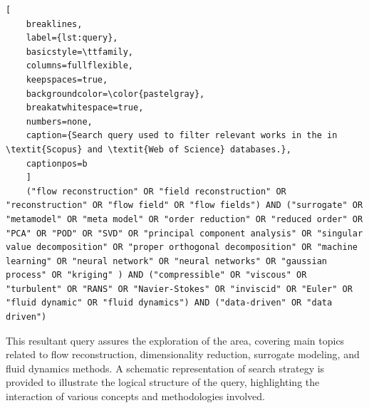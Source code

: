 \begin{lstlisting}[
    breaklines, 
    label={lst:query},
    basicstyle=\ttfamily, 
    columns=fullflexible, 
    keepspaces=true,
    backgroundcolor=\color{pastelgray}, 
    breakatwhitespace=true, 
    numbers=none,
    caption={Search query used to filter relevant works in the in \textit{Scopus} and \textit{Web of Science} databases.},
    captionpos=b
    ]
    ("flow reconstruction" OR "field reconstruction" OR "reconstruction" OR "flow field" OR "flow fields") AND ("surrogate" OR "metamodel" OR "meta model" OR "order reduction" OR "reduced order" OR "PCA" OR "POD" OR "SVD" OR "principal component analysis" OR "singular value decomposition" OR "proper orthogonal decomposition" OR "machine learning" OR "neural network" OR "neural networks" OR "gaussian process" OR "kriging" ) AND ("compressible" OR "viscous" OR "turbulent" OR "RANS" OR "Navier-Stokes" OR "inviscid" OR "Euler" OR "fluid dynamic" OR "fluid dynamics") AND ("data-driven" OR "data driven")    
\end{lstlisting} 

This resultant query assures the exploration of the area, covering main topics related to flow reconstruction, dimensionality reduction, surrogate modeling, and fluid dynamics methods. A schematic  representation of search strategy is provided to illustrate the logical structure of the query, highlighting the interaction of various concepts and methodologies involved.

